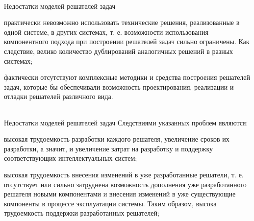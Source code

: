 \begin{frame}{\\Недостатки моделей решателей задач}
	\topline
	\justifying
	\begin{textitemize}
		\item практически невозможно использовать технические решения, реализованные в одной системе, в других системах, т. е. возможности использования компонентного подхода при построении решателей задач сильно ограничены. Как следствие, велико количество дублирований аналогичных решений в разных системах;
		\item фактически отсутствуют комплексные методики и средства построения решателей задач, которые бы обеспечивали возможность проектирования, реализации и отладки решателей различного вида.
	\end{textitemize}
\end{frame}

\begin{frame}{\\Недостатки моделей решателей задач}
	\topline
	\justifying
	Следствиями указанных проблем являются:
	\begin{textitemize}
		\item высокая трудоемкость разработки каждого решателя, увеличение сроков их разработки, а значит, и увеличение затрат на разработку и поддержку соответствующих интеллектуальных систем;
		\item высокая трудоемкость внесения изменений в уже разработанные решатели, т. е. отсутствует или сильно затруднена возможность дополнения уже разработанного решателя новыми компонентами и внесения изменений в уже существующие компоненты в процессе эксплуатации системы. Таким образом, высока трудоемкость поддержки разработанных решателей;
	\end{textitemize}
\end{frame}

